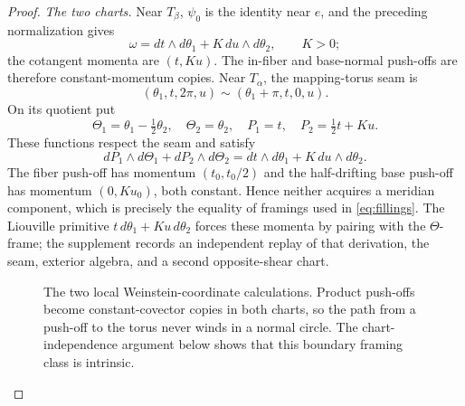 \documentclass[11pt]{article}
\theoremstyle{definition}
\begin{document}
\begin{proof}
\emph{The two charts.}  Near $T_\beta$, $\psi_0$ is the identity near $e$,
and the preceding normalization gives
\[
 \omega=dt\wedge d\theta_1+K\,du\wedge d\theta_2,\qquad K>0;
\]
the cotangent momenta are $(t,Ku)$.  The in-fiber and base-normal push-offs
are therefore constant-momentum copies.  Near $T_\alpha$, the mapping-torus
seam is
\[
 (\theta_1,t,2\pi,u)\sim(\theta_1+\pi,t,0,u).
\]
On its quotient put
\[
 \Theta_1=\theta_1-\tfrac12\theta_2,\quad
 \Theta_2=\theta_2,\quad P_1=t,\quad P_2=\tfrac12t+Ku.
\]
These functions respect the seam and satisfy
\[
 dP_1\wedge d\Theta_1+dP_2\wedge d\Theta_2
 =dt\wedge d\theta_1+K\,du\wedge d\theta_2.
\]
The fiber push-off has momentum $(t_0,t_0/2)$ and the half-drifting base
push-off has momentum $(0,Ku_0)$, both constant.  Hence neither acquires a
meridian component, which is precisely the equality of framings used in
\eqref{eq:fillings}.  The Liouville primitive
$t\,d\theta_1+Ku\,d\theta_2$ forces these momenta by pairing with the
$\Theta$-frame; the supplement records an independent replay of that
derivation, the seam, exterior algebra, and a second opposite-shear chart.

\begin{figure}[!htbp]
\centering
{}
\caption{The two local Weinstein-coordinate calculations.  Product
push-offs become constant-covector copies in both charts, so the path from a
push-off to the torus never winds in a normal circle.  The chart-independence
argument below shows that this boundary framing class is intrinsic.}
\label{fig:weinstein-coordinates}
\end{figure}
\FloatBarrier


\end{proof}
\end{document}
